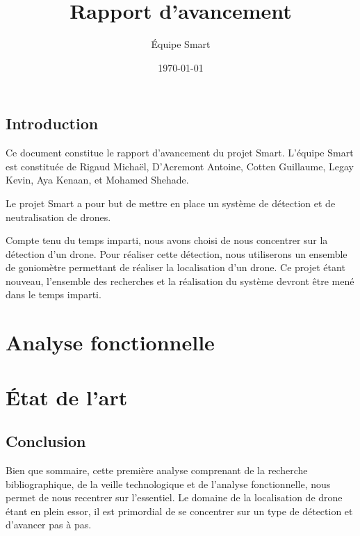 \documentclass[a4paper, 11pt, oneside]{memoir}
\title{Rapport d'avancement}
\author{Équipe Smart}
\date{\today}
\newcounter{rem}[chapter]
\newcounter{th}[chapter]
\begin{document}
\maketitle
\thispagestyle{empty}
\newpage

\tableofcontents

\newpage

\chapter*{Introduction}

Ce document constitue le rapport d'avancement du projet Smart.
L'équipe Smart est constituée de Rigaud Michaël, D'Acremont Antoine, Cotten Guillaume, Legay Kevin, Aya Kenaan, et Mohamed Shehade.

Le projet Smart a pour but de mettre en place un système de détection et de neutralisation de drones.

Compte tenu du temps imparti, nous avons choisi de nous concentrer sur la détection d'un drone. Pour réaliser cette détection, nous utiliserons un ensemble de goniomètre permettant de réaliser la localisation d'un drone. Ce projet étant nouveau, l'ensemble des recherches et la réalisation du système devront être mené dans le temps imparti.



\newpage


\part{Analyse fonctionnelle}



\part{État de l'art}





\chapter*{Conclusion}
Bien que sommaire, cette première analyse comprenant de la recherche bibliographique, de la veille technologique et de l'analyse fonctionnelle, nous permet de nous recentrer sur l'essentiel. Le domaine de la localisation de drone étant en plein essor, il est primordial de se concentrer sur un type de détection et d'avancer pas à pas.
\end{document}
